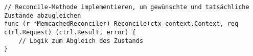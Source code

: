 \begin{verbatim}
// Reconcile-Methode implementieren, um gewünschte und tatsächliche Zustände abzugleichen
func (r *MemcachedReconciler) Reconcile(ctx context.Context, req ctrl.Request) (ctrl.Result, error) {
    // Logik zum Abgleich des Zustands
}
\end{verbatim}